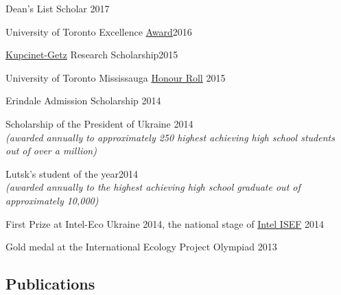 \documentclass[margin,line]{res}
\begin{document}
\begin{resume}
\vspace*{-3mm}

Dean’s List Scholar \hfill{2017}

\vspace*{-3mm}

University of Toronto Excellence \href{https://registrar.utoronto.ca/finances-and-funding/utea/}{Award}\hfill{2016}


\vspace*{-3mm}

\href{https://www.weizmann.ac.il/feinberg/admissions/kupcinet-getz-international-summer-school/about-program-0}{Kupcinet-Getz} Research Scholarship\hfill{2015}

\vspace*{-3mm}


University of Toronto Mississauga \href{https://www.utm.utoronto.ca/cps/honour-roll/2014-15}{Honour Roll} \hfill{2015}

\vspace*{-3mm}

Erindale Admission Scholarship  \hfill{2014} 

\vspace*{-3mm}

Scholarship of the President of Ukraine \hfill{2014}\\
{\em(awarded annually to approximately 250 highest achieving high school students out of over a million)}

\vspace*{-3mm}

Lutsk's student of the year\hfill{2014}\\
{\em(awarded annually to the highest achieving high school graduate out of approximately 10,000)}
\vspace*{-3mm}

First Prize at Intel-Eco Ukraine 2014, the national stage of \href{https://student.societyforscience.org/intel-isef}{Intel ISEF} \hfill{2014}

\vspace*{-3mm}

Gold medal at the International Ecology Project Olympiad \hfill{2013}


\end{resume}
\newpage
\pagestyle{headings}
\begin{resume}
\section{\sc Publications}


\end{resume}
\end{document}
